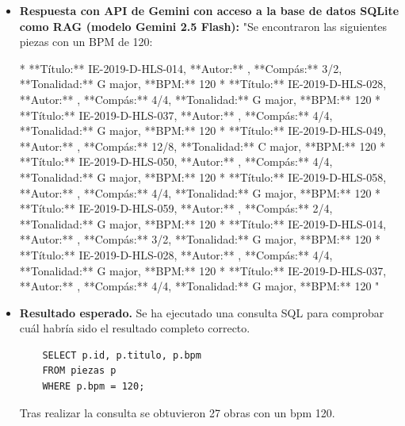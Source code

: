 \begin{itemize}
* En la segunda medida del primer compás (""Part: P1, Measure: 2""), el ritmo es bastante rápido (un eighth note cada ""128"" de tiempo).
* En la cuarta medida del tercer compás (""Part: P1, Measure: 3""), el ritmo también es rápido, con un quarter note cada ""128"" de tiempo.
* No hay información específica sobre BPM en las demás medidas.

Es importante tener en cuenta que el BPM no se indica explícitamente en la partitura. Si necesitas saber con precisión cuáles son las piezas con un BPM de 120, te recomendaría verificar la partitura original o consultar con alguien que tenga acceso a ella."
    \item \textbf{Respuesta con API de Gemini con acceso a la base de datos SQLite como RAG (modelo Gemini 2.5 Flash):} "Se encontraron las siguientes piezas con un BPM de 120:

*   **Título:** IE-2019-D-HLS-014, **Autor:** , **Compás:** 3/2, **Tonalidad:** G major, **BPM:** 120
*   **Título:** IE-2019-D-HLS-028, **Autor:** , **Compás:** 4/4, **Tonalidad:** G major, **BPM:** 120
*   **Título:** IE-2019-D-HLS-037, **Autor:** , **Compás:** 4/4, **Tonalidad:** G major, **BPM:** 120
*   **Título:** IE-2019-D-HLS-049, **Autor:** , **Compás:** 12/8, **Tonalidad:** C major, **BPM:** 120
*   **Título:** IE-2019-D-HLS-050, **Autor:** , **Compás:** 4/4, **Tonalidad:** G major, **BPM:** 120
*   **Título:** IE-2019-D-HLS-058, **Autor:** , **Compás:** 4/4, **Tonalidad:** G major, **BPM:** 120
*   **Título:** IE-2019-D-HLS-059, **Autor:** , **Compás:** 2/4, **Tonalidad:** G major, **BPM:** 120
*   **Título:** IE-2019-D-HLS-014, **Autor:** , **Compás:** 3/2, **Tonalidad:** G major, **BPM:** 120
*   **Título:** IE-2019-D-HLS-028, **Autor:** , **Compás:** 4/4, **Tonalidad:** G major, **BPM:** 120
*   **Título:** IE-2019-D-HLS-037, **Autor:** , **Compás:** 4/4, **Tonalidad:** G major, **BPM:** 120
"
    \item \textbf{Resultado esperado.} Se ha ejecutado una consulta SQL para comprobar cuál habría sido el resultado completo correcto.
    \begin{verbatim}
    SELECT p.id, p.titulo, p.bpm
    FROM piezas p
    WHERE p.bpm = 120;
    \end{verbatim}    
    Tras realizar la consulta se obtuvieron 27 obras con un bpm 120.


\end{itemize}
